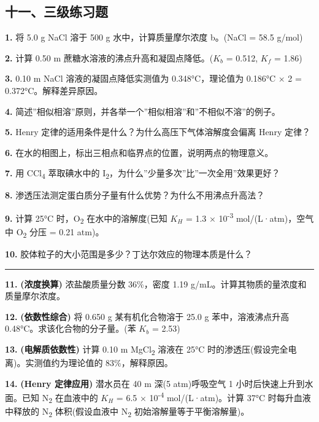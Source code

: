 \documentclass[a4paper,11pt]{ctexart}
\newcommand{\箭}{\ensuremath{\rightarrow}}
\newcommand{\左箭}{\ensuremath{\leftarrow}}
\newcommand{\上箭}{\ensuremath{\uparrow}}
\newcommand{\下箭}{\ensuremath{\downarrow}}
\newcommand{\衡}{\ensuremath{\rightleftharpoons}}
\newcommand{\双箭}{\ensuremath{\leftrightarrow}}
\newcommand{\约等于}{\ensuremath{\approx}}
\newcommand{\小于等于}{\ensuremath{\leq}}
\newcommand{\大于等于}{\ensuremath{\geq}}
\newcommand{\不等于}{\ensuremath{\neq}}
\newcommand{\西格马}{\ensuremath{\sigma}}
\newcommand{\派}{\ensuremath{\pi}}
\begin{document}
\subsection{十一、三级练习题}\label{ux5341ux4e00ux4e09ux7ea7ux7ec3ux4e60ux9898}

\textbf{1.} 将 5.0 g NaCl 溶于 500 g 水中，计算质量摩尔浓度 b。(NaCl = 58.5 g/mol)

\textbf{2.} 计算 0.50 m 蔗糖水溶液的沸点升高和凝固点降低。(\(K_b\) = 0.512, \(K_f\) = 1.86)

\textbf{3.} 0.10 m NaCl 溶液的凝固点降低实测值为 0.348°C，理论值为 0.186°C × 2 = 0.372°C。解释差异原因。

\textbf{4.} 简述''相似相溶''原则，并各举一个''相似相溶''和''不相似不溶''的例子。

\textbf{5.} Henry 定律的适用条件是什么？为什么高压下气体溶解度会偏离 Henry 定律？

\textbf{6.} 在水的相图上，标出三相点和临界点的位置，说明两点的物理意义。

\textbf{7.} 用 CCl\textsubscript{4} 萃取碘水中的 I\textsubscript{2}，为什么''少量多次''比''一次全用''效果更好？

\textbf{8.} 渗透压法测定蛋白质分子量有什么优势？为什么不用沸点升高法？

\textbf{9.} 计算 25°C 时，O\textsubscript{2} 在水中的溶解度(已知 \(K_H\) = 1.3 × 10\textsuperscript{-3} mol/(L·atm)，空气中 O\textsubscript{2} 分压 = 0.21 atm)。

\textbf{10.} 胶体粒子的大小范围是多少？丁达尔效应的物理本质是什么？

\begin{center}\rule{0.5\linewidth}{0.5pt}\end{center}

\textbf{11.} \textbf{(浓度换算)} 浓盐酸质量分数 36\%，密度 1.19 g/mL。计算其物质的量浓度和质量摩尔浓度。

\textbf{12.} \textbf{(依数性综合)} 将 0.650 g 某有机化合物溶于 25.0 g 苯中，溶液沸点升高 0.48°C。求该化合物的分子量。(苯 \(K_b\) = 2.53)

\textbf{13.} \textbf{(电解质依数性)} 计算 0.10 m MgCl\textsubscript{2} 溶液在 25°C 时的渗透压(假设完全电离)。实测值约为理论值的 83\%，解释原因。

\textbf{14.} \textbf{(Henry 定律应用)} 潜水员在 40 m 深(5 atm)呼吸空气 1 小时后快速上升到水面。已知 N\textsubscript{2} 在血液中的 \(K_H\) = 6.5 × 10\textsuperscript{-4} mol/(L·atm)。计算 37°C 时每升血液中释放的 N\textsubscript{2} 体积(假设血液中 N\textsubscript{2} 初始溶解量等于平衡溶解量)。
\end{document}
